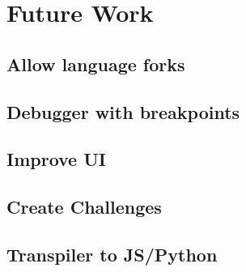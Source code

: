 \chapter{Future Work}

\section{Allow language forks}

\section{Debugger with breakpoints}

\section{Improve UI}

\section{Create Challenges}

\section{Transpiler to JS/Python}